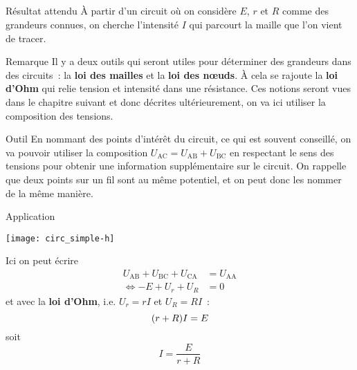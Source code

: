 \documentclass[a4paper, 12pt, final, garamond]{book}
\begin{document}
\subsection{}
\begin{tcbraster}[raster columns=5, raster equal height=rows]
    \begin{NCprop}[raster multicolumn=2]{Résultat attendu}
        À partir d'un circuit où on considère $E$, $r$ et $R$ comme des
        grandeurs connues, on cherche l'intensité $I$ qui parcourt la maille que
        l'on vient de tracer.
    \end{NCprop}
    \begin{NCrema}[raster multicolumn=3]{Remarque}
        Il y a deux outils qui seront utiles pour déterminer des grandeurs dans
        des circuits~: la \textbf{loi des mailles} et la \textbf{loi des nœuds}.
        À cela se rajoute la \textbf{loi d'Ohm} qui relie tension et intensité
        dans une résistance. Ces notions seront vues dans le chapitre suivant et
        donc décrites ultérieurement, on va ici utiliser la composition des
        tensions.
    \end{NCrema}
\end{tcbraster}
\begin{tcbraster}[raster columns=3, raster equal height=rows]
    \begin{NCrapp}{Outil}
        En nommant des points d'intérêt du circuit, ce qui est souvent
        conseillé, on va pouvoir utiliser la composition $U_\mathrm{AC} =
        U_\mathrm{AB} + U_\mathrm{BC}$ en respectant le sens des tensions pour
        obtenir une information supplémentaire sur le circuit. \smallbreak
        On rappelle que deux points sur un fil sont au même potentiel, et on
        peut donc les nommer de la même manière.
    \end{NCrapp}
    \begin{NCexem}[raster multicolumn=2, sidebyside]{Application}
        \begin{center}
            \texttt{[image: circ\_simple-h]}
        \end{center}
        \tcblower
        Ici on peut écrire
        \begin{align*}
            U_\mathrm{AB} + U_\mathrm{BC} + U_\mathrm{CA} & = U_\mathrm{AA}\\
            \Leftrightarrow -E + U_r + U_R                & = 0
        \end{align*}
        et avec la \textbf{loi d'Ohm}, i.e. $U_r = rI$ et $U_R = RI$~:
        \begin{equation*}
            (r+R)I = E\\
        \end{equation*}
        soit
        \begin{equation*}
            \boxed{I = \frac{E}{r+R}}
        \end{equation*}
    \end{NCexem}
\end{tcbraster}
\end{document}
